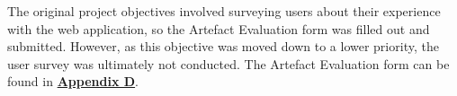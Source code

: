The original project objectives involved surveying users about their experience with the web application, so the Artefact Evaluation form was filled out and submitted. However, as this objective was moved down to a lower priority, the user survey was ultimately not conducted. The Artefact Evaluation form can be found in \textbf{\hyperref[appendix:artefact]{Appendix D}}.
